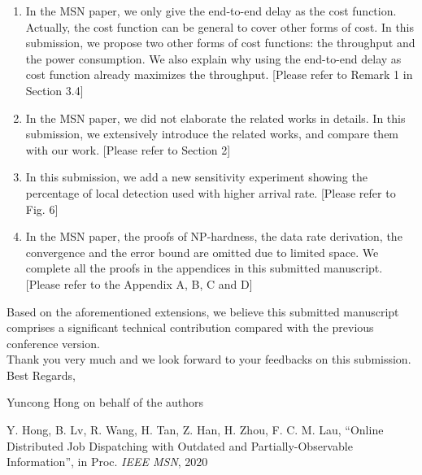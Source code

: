 \documentclass[10pt,draftclsnofoot,onecolumn]{article}
\newcommand{\fixit}[1]{{\leavevmode\color{red}#1}}
\begin{document}
\begin{enumerate}
\item In the MSN paper, \fixit{we only give the end-to-end delay as the cost function. Actually, the cost function can be general to  cover other forms of cost. In this submission, we propose two other forms of cost functions: the throughput and the power consumption. We also explain why using the end-to-end delay as cost function already maximizes the throughput. [Please refer to Remark 1 in Section 3.4]}
\item In the MSN paper, \fixit{we did not elaborate the related works in details. In this submission, we extensively introduce the related works, and compare them with our work. [Please refer to Section 2]}
\item In this submission, \fixit{we add a new sensitivity experiment showing the percentage of local detection used with higher arrival rate. [Please refer to Fig. 6]}
\item In the MSN paper, \fixit{the proofs of NP-hardness, the data rate derivation, the convergence and the error\newcommand{\fixit}[1]{{\leavevmode\color{red}#1}} bound are omitted due to limited space. We complete all the proofs in the appendices in this submitted manuscript.  [Please refer to the Appendix A, B, C and D]}
\end{enumerate}

Based on the aforementioned extensions, we believe this submitted manuscript comprises a significant technical contribution compared with the previous conference version.\\

Thank you very much and we look forward to your feedbacks on this submission.\\

Best Regards,

Yuncong Hong on behalf of the authors
\vspace{+20mm}

\noindent [1] Y. Hong, B. Lv, R. Wang, H. Tan, Z. Han, H. Zhou, F. C. M. Lau, ``Online Distributed Job Dispatching with Outdated and Partially-Observable Information'', in Proc. \emph{IEEE MSN}, 2020\\
\end{document}
